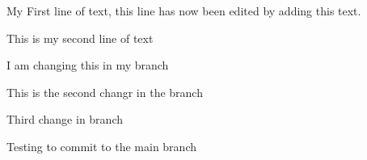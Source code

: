 \documentclass{article}
\begin{document}
My First line of text, this line has now been edited by adding this text.


This is my second line of text

I am changing this in my branch

This is the second changr in the branch

Third change in branch

Testing to commit to the main branch
\end{document}
